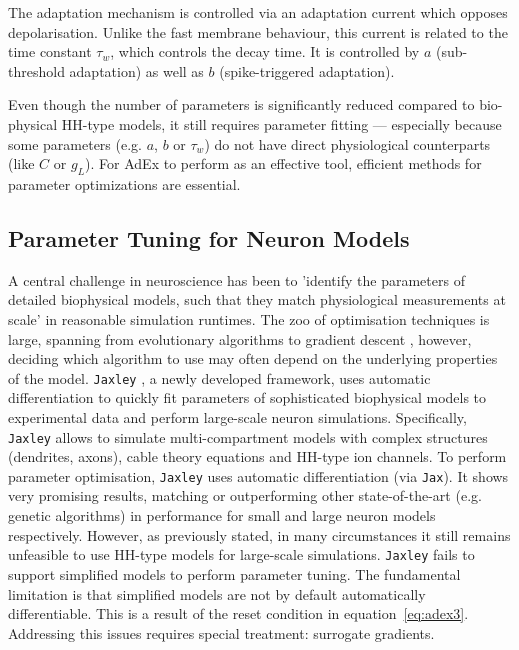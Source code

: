 \documentclass[conference]{IEEEtran}
\begin{document}
The adaptation mechanism is controlled via an adaptation current which opposes depolarisation.
Unlike the fast membrane behaviour, this current is related to the time constant $\tau_w$, which controls the decay time.
It is controlled by $a$ (sub-threshold adaptation) as well as $b$ (spike-triggered adaptation).

Even though the number of parameters is significantly reduced compared to bio-physical \ac{HH}-type models, it still requires parameter fitting --- especially because some parameters (e.g. $a$, $b$ or $\tau_w$) do not have direct physiological counterparts (like $C$ or $g_L$).
For AdEx to perform as an effective tool, efficient methods for parameter optimizations are essential.

\subsection{Parameter Tuning for Neuron Models}
A central challenge in neuroscience has been to 'identify the parameters of detailed biophysical models, such that they match physiological measurements at scale' \cite{Deistler2025} in reasonable simulation runtimes.
The zoo of optimisation techniques is large, spanning from evolutionary algorithms \cite{VanGeit2008} to gradient descent \cite{Jones2024}, however, deciding which algorithm to use may often depend on the underlying properties of the model.
\texttt{Jaxley} \cite{Deistler2025}, a newly developed framework, uses automatic differentiation to quickly fit parameters of sophisticated biophysical models to experimental data and perform large-scale neuron simulations.
Specifically, \texttt{Jaxley} allows to simulate multi-compartment models with complex structures (dendrites, axons), cable theory equations and \ac{HH}-type ion channels.
To perform parameter optimisation, \texttt{Jaxley} uses automatic differentiation (via \texttt{Jax}).
It shows very promising results, matching or outperforming other state-of-the-art (e.g. genetic algorithms) in performance for small and large neuron models respectively.
However, as previously stated, in many circumstances it still remains unfeasible to use \ac{HH}-type models for large-scale simulations.
\texttt{Jaxley} fails to support simplified models to perform parameter tuning.
The fundamental limitation is that simplified models are not by default automatically differentiable.
This is a result of the reset condition in equation~\ref{eq:adex3}.
Addressing this issues requires special treatment: surrogate gradients.
\end{document}
